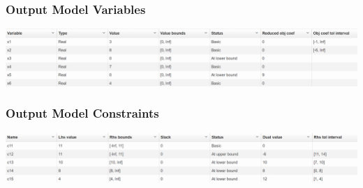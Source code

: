 \documentclass[14pt]{extarticle}
\begin{document}
\subsubsection*{Output Model Variables}
\includegraphics[width=\textwidth]{OutputVariables.PNG}

\subsubsection*{Output Model Constraints}
\includegraphics[width=\textwidth]{OutputConstraints.PNG}
\end{document}
